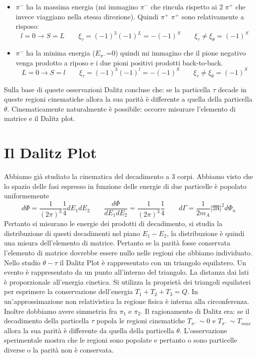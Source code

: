 \begin{itemize}
	\item $\pi^-$ ha la massima energia (mi immagino $\pi^-$ che rincula rispetto ai 2 $\pi^+$ che invece viaggiano nella stessa direzione). Quindi $\pi^+$ $\pi^+$ sono relativamente a risposo:
	$$
	l=0\to S=L \qquad \xi_\tau = (-1)^3 (-1)^L = -(-1)^S \qquad \xi_\tau \neq \xi_\theta = (-1)^S
	$$
	\item $\pi^-$ ha la minima energia ($E_{\pi^-}$=0) quindi mi immagino che il pione negativo venga prodotto a riposo e i due pioni positivi prodotti back-to-back.
	$$
	L=0\to S=l \qquad \xi_\tau = (-1)^3 (-1)^l = -(-1)^S \qquad \xi_\tau \neq \xi_\theta = (-1)^S
	$$
\end{itemize}
Sulla base di queste osservazioni Dalitz concluse che: se la particella $\tau$ decade in queste regioni cinematiche allora la sua parità è differente a quella della particella $\theta$. Cinematicamente naturalmente è possibile: occorre misurare l'elemento di matrice e il Dalitz plot.
\section{Il Dalitz Plot}
Abbiamo già studiato la cinematica del decadimento a $3$ corpi. Abbiamo visto che lo spazio delle fasi espresso in funzione delle energie di due particelle è popolato uniformemente
$$
d\Phi = \frac{1}{(2\pi)^3} \frac{1}{4} dE_1 dE_2 \qquad\frac{d\Phi}{dE_1 dE_2} = \frac{1}{(2\pi)^3} \frac{1}{4}\qquad d\Gamma = \frac{1}{2m_A} |\mathfrak{M}|^2 d\Phi_n
$$
Pertanto si misurano le energie dei prodotti di decadimento, si studia la distribuzione di questi decadimenti nel piano $E_1-E_2$, la distribuzione è quindi una misura dell'elemento di matrice. Pertanto se la parità fosse conservata l'elemento di matrice dovrebbe essere nullo nelle regioni che abbiamo individuato. Nello studio $\theta-\tau$ il Dalitz Plot è rappresentato con un triangolo equilatero. Un evento è rappresentato da un punto all'interno del triangolo. La distanza dai lati è proporzionale all'energia cinetica. Si utilizza la proprietà dei triangoli equilateri per esprimere la conservazione dell'energia $T_1+T_2+T_3=Q$. In un'approssimazione non relativistica la regione fisica è interna alla circonferenza. Inoltre dobbiamo avere simmetria fra $\pi_1$ e $\pi_2$. Il ragionamento di Dalitz era: se il decadimento della particella $\tau$ popola le regioni cinematiche $T_{\pi^-}\sim0$ e $T_{\pi^-}\sim T_{max}$ allora la sua parità è differente da quella della particella $\theta$. L'osservazione sperimentale mostra che le regioni sono popolate e pertanto o sono particelle diverse o la parità non è conservata.
